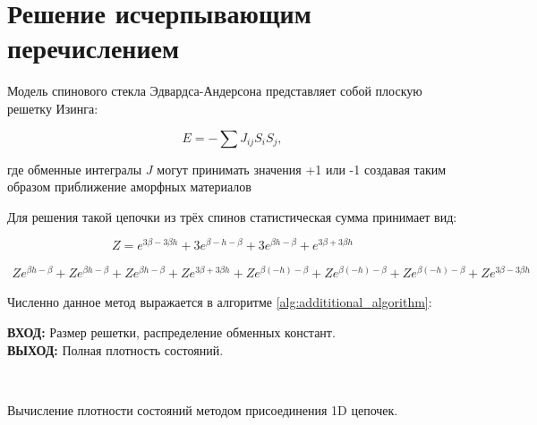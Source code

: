 \documentclass[utf8, babel, sor, jor, amsmath, amssymb, reprint]{elsarticle} %
\begin{document}
\section{Решение исчерпывающим перечислением}

Модель спинового стекла Эдвардса-Андерсона представляет собой плоскую решетку Изинга:

\begin{equation}
	E = -\sum J_{ij} S_i S_j,
	\label{eq:ising_energy}
\end{equation}

 где обменные интегралы $J$ могут принимать значения +1 или -1 создавая таким образом приближение аморфных материалов

Для решения такой цепочки из трёх спинов статистическая сумма
принимает вид:

\begin{equation}
	Z = e^{3\beta - 3\beta h} + 3e^{\beta - h - \beta} + 3e^{\beta h - \beta} + e^{3\beta + 3\beta h}
	\label{eq:stat_3}
\end{equation}

\begin{equation}
	\label{eq:stat_3_un}
	\begin{alignedat}{2}
	Z e^{\beta  h-\beta }+Z e^{\beta  h-\beta }+Z e^{\beta  h-\beta }+Z e^{3 \beta +3 \beta  h}+Z e^{\beta  (-h)-\beta }+Z e^{\beta  (-h)-\beta }+Z e^{\beta  (-h)-\beta }+Z e^{3 \beta -3 \beta  h}
	\end{alignedat}
\end{equation}

Численно данное метод выражается в алгоритме \ref{alg:addititional_algorithm}:

\begin{algorithm}[H]
	\textbf{ВХОД:} Размер решетки, распределение обменных констант.\\
	\textbf{ВЫХОД:} Полная плотность состояний.
	\begin{algorithmic}
		{
			{
			}
			\ENDFOR\\
		}
		\ENDFOR
	\end{algorithmic}
	\caption{Вычисление плотности состояний методом присоединения 1D цепочек.}
	\label{alg:addititional_algorithm}
\end{algorithm}
				
\end{document}
